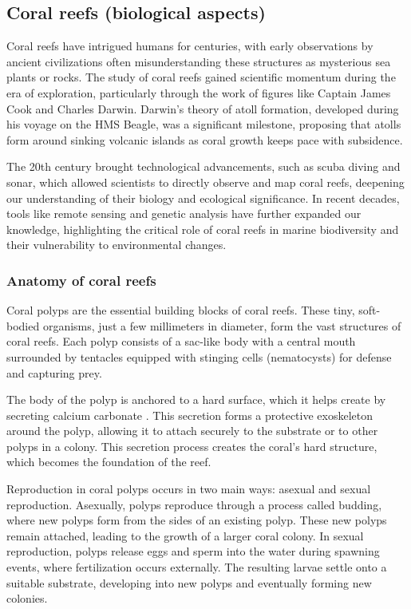 \subsection{Coral reefs (biological aspects)}
\label{sec:state-of-the-art_biology}

Coral reefs have intrigued humans for centuries, with early observations by ancient civilizations often misunderstanding these structures as mysterious sea plants or rocks. The study of coral reefs gained scientific momentum during the era of exploration, particularly through the work of figures like Captain James Cook and Charles Darwin. Darwin's theory of atoll formation, developed during his voyage on the HMS Beagle, was a significant milestone, proposing that atolls form around sinking volcanic islands as coral growth keeps pace with subsidence.

The 20th century brought technological advancements, such as scuba diving and sonar, which allowed scientists to directly observe and map coral reefs, deepening our understanding of their biology and ecological significance. In recent decades, tools like remote sensing and genetic analysis have further expanded our knowledge, highlighting the critical role of coral reefs in marine biodiversity and their vulnerability to environmental changes.

\subsubsection{Anatomy of coral reefs}


Coral polyps are the essential building blocks of coral reefs. These tiny, soft-bodied organisms, just a few millimeters in diameter, form the vast structures of coral reefs. Each polyp consists of a sac-like body with a central mouth surrounded by tentacles equipped with stinging cells (nematocysts) for defense and capturing prey.

The body of the polyp is anchored to a hard surface, which it helps create by secreting calcium carbonate . This secretion forms a protective exoskeleton around the polyp, allowing it to attach securely to the substrate or to other polyps in a colony. This secretion process creates the coral's hard structure, which becomes the foundation of the reef.

Reproduction in coral polyps occurs in two main ways: asexual and sexual reproduction. Asexually, polyps reproduce through a process called budding, where new polyps form from the sides of an existing polyp. These new polyps remain attached, leading to the growth of a larger coral colony. In sexual reproduction, polyps release eggs and sperm into the water during spawning events, where fertilization occurs externally. The resulting larvae settle onto a suitable substrate, developing into new polyps and eventually forming new colonies.

